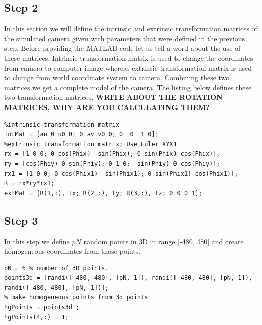 \documentclass[a4paper, 10pt]{article}
\begin{document}
\subsection{Step 2}\label{step2}
In this section we will define the intrinsic and extrinsic transformation matrices of the simulated camera given with parameters that were defined in the previous step. Before providing the MATLAB code let us tell a word about the use of these matrices. Intrinsic transformation matrix is used to change the coordinates from camera to computer image whereas extrinsic transformation matrix is used to change from world coordinate system to camera. Combining these two matrices we get a complete model of the camera. The listing below defines these two transformation matrices. \textbf{WRITE ABOUT THE ROTATION MATRICES, WHY ARE YOU CALCULATING THEM?}
\begin{lstlisting}
%intrinsic transformation matrix
intMat = [au 0 u0 0; 0 av v0 0; 0  0  1 0];
%extrinsic transformation matrix; Use Euler XYX1
rx = [1 0 0; 0 cos(Phix) -sin(Phix); 0 sin(Phix) cos(Phix)];
ry = [cos(Phiy) 0 sin(Phiy); 0 1 0; -sin(Phiy) 0 cos(Phiy)];
rx1 = [1 0 0; 0 cos(Phix1) -sin(Phix1); 0 sin(Phix1) cos(Phix1)];
R = rx*ry*rx1;
extMat = [R(1,:), tx; R(2,:), ty; R(3,:), tz; 0 0 0 1];
\end{lstlisting}
%
\subsection{Step 3}\label{step3}
In this step we define $pN$ random points in 3D in range [-480, 480] and create homogeneous coordinates from those points.
\begin{lstlisting}
pN = 6 % number of 3D points.
points3d = [randi([-480, 480], [pN, 1]), randi([-480, 480], [pN, 1]), randi([-480, 480], [pN, 1])];
% make homogeneous points from 3d points
hgPoints = points3d';
hgPoints(4,:) = 1;
\end{lstlisting}
\end{document}
